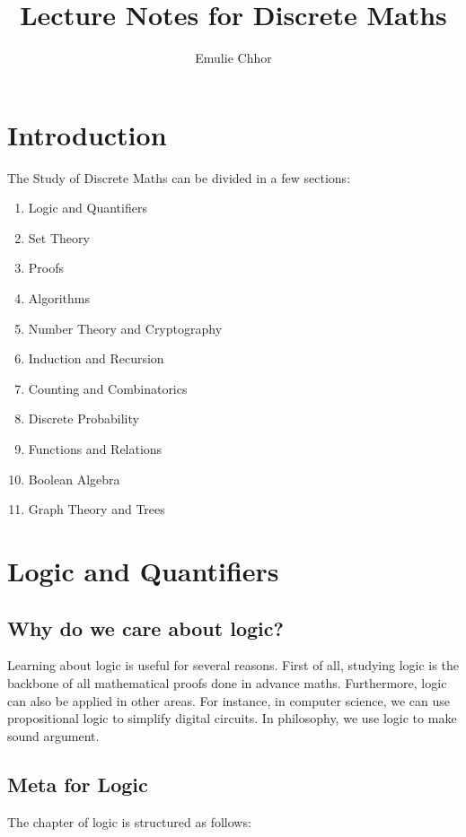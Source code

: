 \documentclass{article}
\begin{document}
\title{Lecture Notes for Discrete Maths}
\author{Emulie Chhor}
\maketitle
\section{Introduction}

The Study of Discrete Maths can be divided in a few sections:\\

    \begin{enumerate}
	\item Logic and Quantifiers
	\item Set Theory
	\item Proofs
	\item Algorithms
	\item Number Theory and Cryptography
	\item Induction and Recursion
	\item Counting and Combinatorics
	\item Discrete Probability
	\item Functions and Relations
	\item Boolean Algebra
	\item Graph Theory and Trees
    \end{enumerate}

\section{Logic and Quantifiers}

\subsection{Why do we care about logic?}

Learning about logic is useful for several reasons. First of all, studying logic
is the backbone of all mathematical proofs done in advance maths. Furthermore,
logic can also be applied in other areas. For instance, in computer science, we
can use propositional logic to simplify digital circuits. In philosophy, we use
logic to make sound argument.

\subsection{Meta for Logic}

The chapter of logic is structured as follows:
\end{document}
